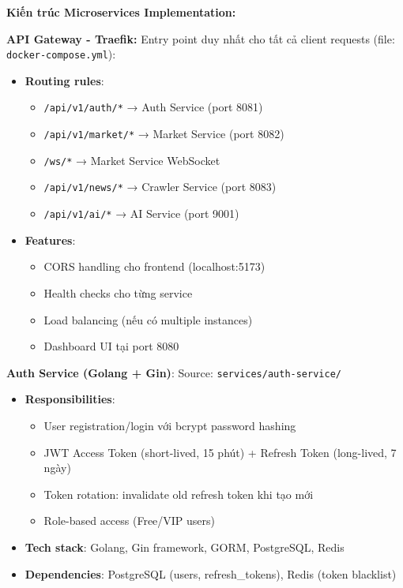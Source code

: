 \noindent\textbf{Kiến trúc Microservices Implementation:}

\noindent\textbf{API Gateway - Traefik:}
Entry point duy nhất cho tất cả client requests (file: \texttt{docker-compose.yml}):

\begin{itemize}
    \item \textbf{Routing rules}:
    \begin{itemize}
        \item \texttt{/api/v1/auth/*} → Auth Service (port 8081)
        \item \texttt{/api/v1/market/*} → Market Service (port 8082)
        \item \texttt{/ws/*} → Market Service WebSocket
        \item \texttt{/api/v1/news/*} → Crawler Service (port 8083)
        \item \texttt{/api/v1/ai/*} → AI Service (port 9001)
    \end{itemize}
    
    \item \textbf{Features}:
    \begin{itemize}
        \item CORS handling cho frontend (localhost:5173)
        \item Health checks cho từng service
        \item Load balancing (nếu có multiple instances)
        \item Dashboard UI tại port 8080
    \end{itemize}
\end{itemize}

\textbf{Auth Service (Golang + Gin)}:
Source: \texttt{services/auth-service/}

\begin{itemize}
    \item \textbf{Responsibilities}:
    \begin{itemize}
        \item User registration/login với bcrypt password hashing
        \item JWT Access Token (short-lived, 15 phút) + Refresh Token (long-lived, 7 ngày)
        \item Token rotation: invalidate old refresh token khi tạo mới
        \item Role-based access (Free/VIP users)
    \end{itemize}
    
    \item \textbf{Tech stack}: Golang, Gin framework, GORM, PostgreSQL, Redis
    \item \textbf{Dependencies}: PostgreSQL (users, refresh\_tokens), Redis (token blacklist)
\end{itemize}

